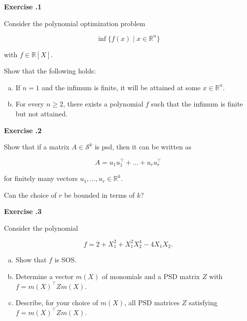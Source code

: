 \documentclass{imo_en}
\newcommand{\R}{\mathbb{R}}
\newcommand{\PSD}{\mathcal{S}}
\newcommand{\set}[1]{\{#1\}}
\begin{document}
\maketitle


{\large \textbf{Exercise \thesheetnumber .1}} \bigskip 

Consider the polynomial optimization problem

$$ \inf \set{f(x) \mid x \in \R^n} $$

with $f \in \R[X]$.

Show that the following holds:
\begin{enumerate}[a)]
	\item If $n = 1$ and the infimum is finite, it will be attained at some $x \in \R^n$. 
	\item For every $n \geq 2$, there exists a polynomial $f$ such that the infimum is finite but not attained.
\end{enumerate} 

\bigskip


{\large \textbf{Exercise \thesheetnumber .2}} \bigskip 

Show that if a matrix $A \in \PSD^k$ is psd, then it can be written as

$$ A = u_1 u_1^\top + \ldots + u_r u_r^\top $$

for finitely many vectors $u_1, \ldots, u_r \in \R^k$.

Can the choice of $r$ be bounded in terms of $k$?

\bigskip


{\large \textbf{Exercise \thesheetnumber .3}} \bigskip 

Consider the polynomial

$$ f = 2 + X_1^2 + X_1^2 X_2^4 - 4X_1 X_2.$$

\begin{enumerate}[a)]
	\item Show that $f$ is SOS.
	\item Determine a vector $m(X)$ of monomials and a PSD matrix $Z$ with $f = {m(X)}^\top Z m(X)$.
	\item Describe, for your choice of $m(X)$, all PSD matrices $Z$ satisfying $f = {m(X)}^\top Z m(X)$.
\end{enumerate}
\end{document}
